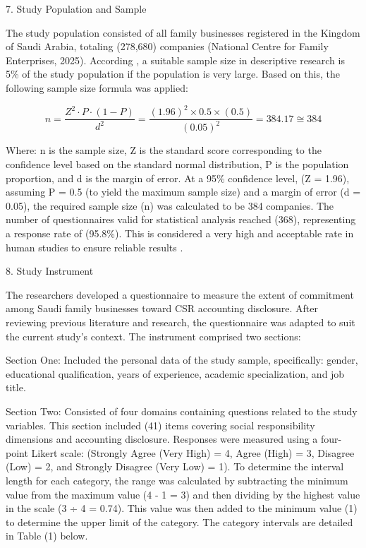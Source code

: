 \documentclass[10pt]{NSP1}
\begin{document}
7. Study Population and Sample

The study population consisted of all family businesses registered in the Kingdom of Saudi Arabia, totaling (278,680) companies (National Centre for Family Enterprises, 2025). According \cite{ref33}, a suitable sample size in descriptive research is 5\% of the study population if the population is very large. Based on this, the following sample size formula was applied:

\begin{equation}
n = \frac{Z^{2} \cdot P \cdot (1 - P)}{d^{2}} = \frac{(1.96)^{2} \times 0.5 \times (0.5)}{(0.05)^{2}} = 384.17 \cong 384

\end{equation}

Where: n is the sample size, Z is the standard score corresponding to the confidence level based on the standard normal distribution, P is the population proportion, and d is the margin of error. At a 95\% confidence level, (Z = 1.96), assuming P = 0.5 (to yield the maximum sample size) and a margin of error (d = 0.05), the required sample size (n) was calculated to be 384 companies. The number of questionnaires valid for statistical analysis reached (368), representing a response rate of (95.8\%). This is considered a very high and acceptable rate in human studies to ensure reliable results \citep{ref34}.

8. Study Instrument

The researchers developed a questionnaire to measure the extent of commitment among Saudi family businesses toward CSR accounting disclosure. After reviewing previous literature and research, the questionnaire was adapted to suit the current study's context. The instrument comprised two sections:

Section One: Included the personal data of the study sample, specifically: gender, educational qualification, years of experience, academic specialization, and job title.

Section Two: Consisted of four domains containing questions related to the study variables. This section included (41) items covering social responsibility dimensions and accounting disclosure. Responses were measured using a four-point Likert scale: (Strongly Agree (Very High) = 4, Agree (High) = 3, Disagree (Low) = 2, and Strongly Disagree (Very Low) = 1). To determine the interval length for each category, the range was calculated by subtracting the minimum value from the maximum value (4 - 1 = 3) and then dividing by the highest value in the scale (3 ÷ 4 = 0.74). This value was then added to the minimum value (1) to determine the upper limit of the category. The category intervals are detailed in Table (1) below.
\end{document}
